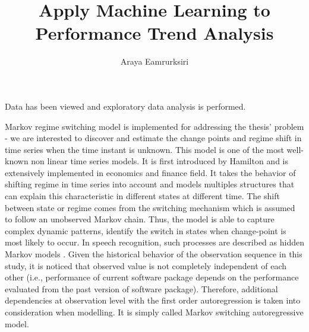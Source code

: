 \documentclass[]{article}
\title{Apply Machine Learning to Performance Trend Analysis}
\author{Araya Eamrurksiri}
\begin{document}
\date{}
\maketitle

Data has been viewed and exploratory data analysis is performed. 

Markov regime switching model is implemented for addressing the thesis' problem - we are interested to discover and estimate the change points and regime shift in time series when the time instant is unknown. This model is one of the most well-known non linear time series models. It is first introduced by Hamilton \cite{hamilton1989new} and is extensively implemented in economics and finance field. It takes the behavior of shifting regime in time series into account and models multiples structures that can explain this characteristic in different states at different time. The shift between state or regime comes from the switching mechanism which is assumed to follow an unobserved Markov chain. Thus, the model is able to capture complex dynamic patterns, identify the switch in states when change-point is most likely to occur. In speech recognition, such processes are described as hidden Markov models \cite{rabiner1989tutorial}. Given the historical behavior of the observation sequence in this study, it is noticed that observed value is not completely independent of each other (i.e., performance of current software package depends on the performance evaluated from the past version of software package). Therefore, additional dependencies at observation level with the first order autoregression is taken into consideration when modelling. It is simply called Markov switching autoregressive model.
\end{document}
